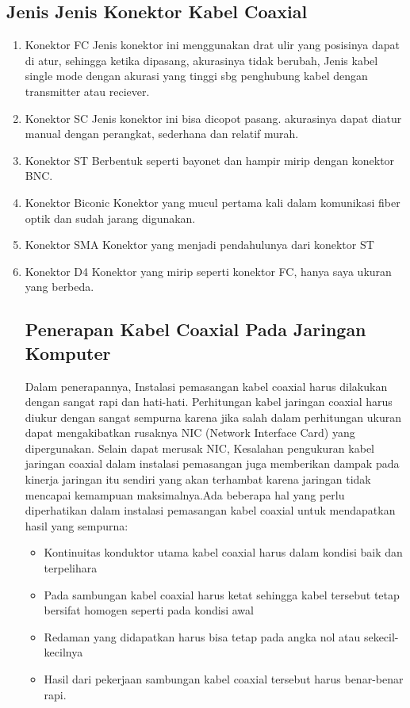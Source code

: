 \begin{itemize}
\begin{itemize}
	\subsection{Jenis Jenis Konektor Kabel Coaxial}
		\begin{enumerate}
			\item Konektor FC
			Jenis konektor ini menggunakan drat ulir yang posisinya dapat di atur, sehingga ketika dipasang, akurasinya tidak berubah, Jenis kabel single mode dengan akurasi yang tinggi sbg penghubung kabel dengan transmitter atau reciever.
			\item Konektor SC
			Jenis konektor ini bisa dicopot pasang. akurasinya dapat diatur manual dengan perangkat, sederhana dan relatif murah.
			\item Konektor ST
			Berbentuk seperti bayonet dan hampir mirip dengan konektor BNC.
			\item Konektor Biconic
			Konektor yang mucul pertama kali dalam komunikasi fiber optik dan sudah jarang digunakan.
			\item Konektor SMA
			Konektor yang menjadi pendahulunya dari konektor ST
			\item Konektor D4
			Konektor yang mirip seperti konektor FC, hanya saya ukuran yang berbeda.
			
	\subsection {Penerapan Kabel Coaxial Pada Jaringan Komputer}
	Dalam penerapannya, Instalasi pemasangan kabel coaxial harus dilakukan dengan sangat rapi dan hati-hati. Perhitungan kabel jaringan coaxial harus diukur dengan sangat sempurna karena jika salah dalam perhitungan ukuran dapat mengakibatkan rusaknya NIC (Network Interface Card) yang dipergunakan. Selain dapat merusak NIC, Kesalahan pengukuran kabel jaringan coaxial dalam instalasi pemasangan juga memberikan dampak pada kinerja jaringan itu sendiri yang akan terhambat karena jaringan tidak mencapai kemampuan maksimalnya.Ada beberapa hal yang perlu diperhatikan dalam instalasi pemasangan kabel coaxial untuk mendapatkan hasil yang sempurna:
		\begin{itemize}
			\item Kontinuitas konduktor utama kabel coaxial harus dalam kondisi baik dan terpelihara
			\item Pada sambungan kabel coaxial harus ketat sehingga kabel tersebut tetap bersifat homogen seperti pada kondisi awal
			\item Redaman yang didapatkan harus bisa tetap pada angka nol atau sekecil-kecilnya
			\item Hasil dari pekerjaan sambungan kabel coaxial tersebut harus benar-benar rapi.
		\end{itemize}
		

\end{enumerate}
\end{itemize}
\end{itemize}
